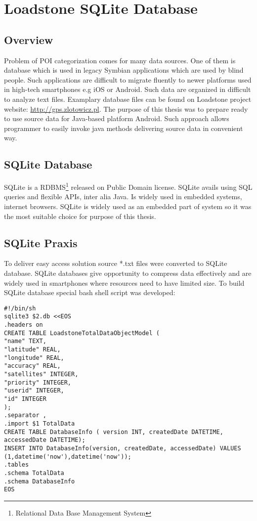 \chapter{Loadstone SQLite Database}\label{chap.loadstone}

\section{Overview}
Problem of POI categorization comes for many data sources. One of them is database which is used in legacy Symbian applications which are used by blind people. Such applications are difficult to migrate fluently to newer platforms used in high-tech smartphones e.g iOS or Android. Such data are organized in difficult to analyze text files. Examplary database files can be found on Loadstone project website: \url{http://gps.zlotowicz.pl}. The purpose of this thesis was to prepare ready to use source data for Java-based platform Android. Such approach allows programmer to easily invoke java methods delivering source data in convenient way.

\section{SQLite Database}
SQLite is a RDBMS\footnote{Relational Data Base Management System} released on Public Domain license. SQLite avails using SQL queries and flexible APIs, inter alia Java. Is widely used in embedded systems, internet browsers. SQLite is widely used as an embedded part of system so it was the most suitable choice for purpose of this thesis.
\section{SQLite Praxis}
To deliver easy access solution source *.txt files were converted to SQLite database. SQLite databases give opportunity to compress data effectively and are widely used in smartphones where resources need to have limited size. To build SQLite database special bash shell script was developed:

\begin{lstlisting}[style=BASH]	
#!/bin/sh
sqlite3 $2.db <<EOS
.headers on
CREATE TABLE LoadstoneTotalDataObjectModel (
"name" TEXT,
"latitude" REAL,
"longitude" REAL,
"accuracy" REAL,
"satellites" INTEGER,
"priority" INTEGER,
"userid" INTEGER,
"id" INTEGER
);
.separator ,
.import $1 TotalData
CREATE TABLE DatabaseInfo ( version INT, createdDate DATETIME, accessedDate DATETIME);
INSERT INTO DatabaseInfo(version, createdDate, accessedDate) VALUES (1,datetime('now'),datetime('now'));
.tables
.schema TotalData
.schema DatabaseInfo
EOS
\end{lstlisting}

